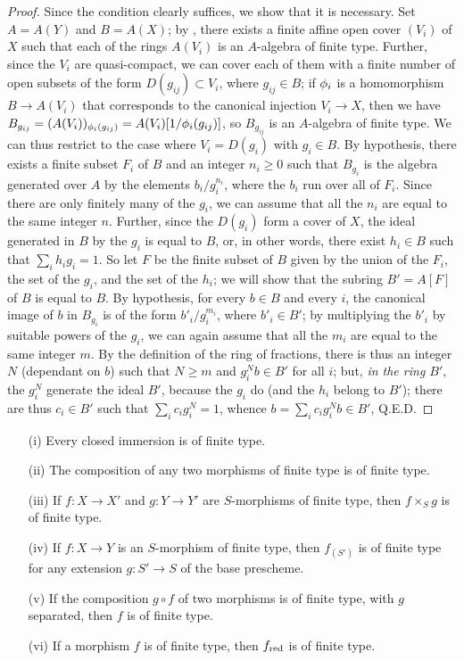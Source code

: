 \begin{proof}
Since the condition clearly suffices, we show that it is necessary.
Set $A=A(Y)$ and $B=A(X)$;
by , there exists a finite affine open cover $(V_i)$ of $X$ such that each of the rings $A(V_i)$ is an $A$-algebra of finite type.
Further, since the $V_i$ are quasi-compact, we can cover each of them with a finite number of open subsets of the form $D(g_{ij})\subset V_i$, where $g_{ij}\in B$;
if $\phi_i$ is a homomorphism $B\to A(V_i)$ that corresponds to the canonical injection $V_i\to X$, then we have $B_{g_{ij}}=(A(V_i))_{\phi_i(g_{ij})}=A(V_i)[1/\phi_i(g_{ij})]$, so $B_{g_{ij}}$ is an $A$-algebra of finite type.
We can thus restrict to the case where $V_i=D(g_i)$ with $g_i\in B$.
By hypothesis, there exists a finite subset $F_i$ of $B$ and an integer $n_i\geq0$ such that $B_{g_i}$ is the algebra generated over $A$ by the elements $b_i/g_i^{n_i}$, where the $b_i$ run over all of $F_i$.
Since there are only finitely many of the $g_i$, we can assume that all the $n_i$ are equal to the same integer $n$.
Further, since the $D(g_i)$ form a cover of $X$, the ideal generated in $B$ by the $g_i$ is equal to $B$, or, in other words, there exist $h_i\in B$ such that $\sum_i h_ig_i=1$.
So let $F$ be the finite subset of $B$ given by the union of the $F_i$, the set of the $g_i$, and the set of the $h_i$; we will show that the subring $B'=A[F]$ of $B$ is equal to $B$.
By hypothesis, for every $b\in B$ and every $i$, the canonical image of $b$ in $B_{g_i}$ is of the form $b'_i/g_i^{m_i}$, where $b'_i\in B'$;
by multiplying the $b'_i$ by suitable powers of the $g_i$, we can again assume that all the $m_i$ are equal to the same integer $m$.
By the definition of the ring of fractions, there is thus an integer $N$ (dependant on $b$) such that $N\geq m$ and $g_i^Nb\in B'$ for all $i$;
but, \emph{in the ring $B'$}, the $g_i^N$ generate the ideal $B'$, because the $g_i$ do (and the $h_i$ belong to $B'$);
there are thus $c_i\in B'$ such that $\sum_i c_ig_i^N=1$, whence $b=\sum_ic_ig_i^Nb\in B'$, Q.E.D.
\end{proof}

\begin{proposition}[6.3.4]
\label{I.6.3.4}
\medskip\noindent
\begin{enumerate}
  \item[{\rm(i)}] Every closed immersion is of finite type.
  \item[{\rm(ii)}] The composition of any two morphisms of finite type is of finite type.
  \item[{\rm(iii)}] If $f:X\to X'$ and $g:Y\to Y'$ are $S$-morphisms of finite type, then $f\times_S g$ is of finite type.
  \item[{\rm(iv)}] If $f:X\to Y$ is an $S$-morphism of finite type, then $f_{(S')}$ is of finite type for any extension $g:S'\to S$ of the base prescheme.
  \item[{\rm(v)}] If the composition $g\circ f$ of two morphisms is of finite type, with $g$ separated, then $f$ is of finite type.
  \item[{\rm(vi)}] If a morphism $f$ is of finite type, then $f_{\mathrm{red}}$ is of finite type.
\end{enumerate}
\end{proposition}

